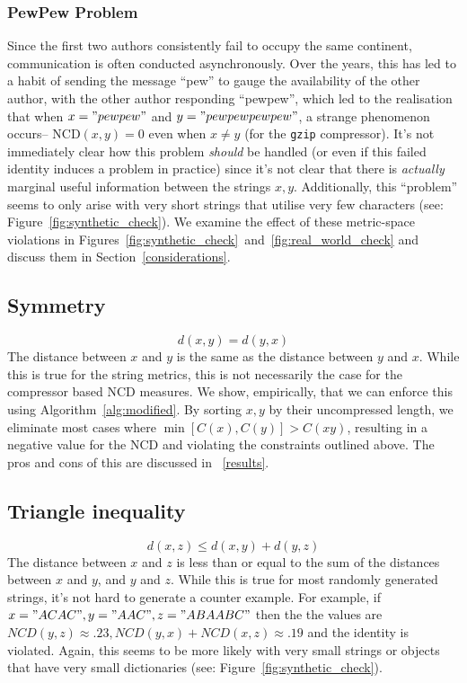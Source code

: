 \documentclass[conference]{IEEEtran}
\begin{document}
\subsubsection{PewPew Problem}
Since the first two authors consistently fail to occupy the same continent, communication is often conducted asynchronously. 
Over the years, this has led to a habit of sending the message ``pew'' to gauge the availability of the other author, with the other author responding ``pewpew'', which led to the realisation that when $x = "pewpew"$ and $y="pewpewpewpew"$, a strange phenomenon occurs-- NCD$(x,y) = 0$ even when $x \neq y$ (for the \texttt{gzip} compressor). 
It's not immediately clear how this problem \textit{should} be handled (or even if this failed identity induces a problem in practice) since it's not clear that there is \textit{actually} marginal useful information between the strings $x,y$. 
Additionally, this ``problem'' seems to only arise with very short strings that utilise very few characters (see: Figure~\ref{fig:synthetic_check}).
We examine the effect of these metric-space violations in Figures~\ref{fig:synthetic_check}~and~\ref{fig:real_world_check} and discuss them in Section~\ref{considerations}.

\subsection{Symmetry} 
$$
d(x, y) = d(y, x)
$$
The distance between $ x $ and $ y $ is the same as the distance between $ y $ and $ x $. While this is true for the string metrics, this is not necessarily the case for the compressor based NCD measures. 
We show, empirically, that we can enforce this using Algorithm~\ref{alg:modified}. 
By sorting $x,y$ by their uncompressed length, we eliminate most cases where $\min[C(x), C(y)] > C(xy)$, resulting in a negative value for the NCD and violating the constraints outlined above.
The pros and cons of this are discussed in ~\ref{results}.

\subsection{Triangle inequality} 
$$
d(x, z) \leq d(x, y) + d(y, z)
$$
The distance between $ x $ and $ z $ is less than or equal to the sum of the distances between $ x $ and $ y $, and $ y $ and $ z $. While this is true for most randomly generated strings, it's not hard to generate a counter example. 
For example, if $ x = "ACAC", y = "AAC", z = "ABAABC" $ then the the values are $ NCD(y,z) \approx .23, NCD(y,x) + NCD(x,z) \approx .19 $ and the identity is violated. 
Again, this seems to be more likely with very small strings or objects that have very small dictionaries (see: Figure~\ref{fig:synthetic_check}).
\end{document}
